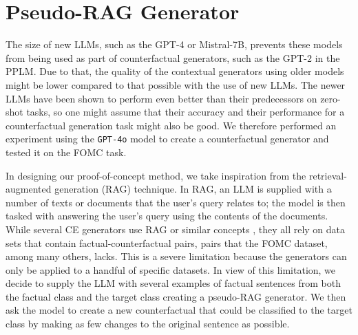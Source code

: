 \documentclass[11pt]{article}
\begin{document}
\section{Pseudo-RAG Generator}\label{appendix:pseudo-rag}

The size of new LLMs, such as the GPT-4 or Mistral-7B, prevents these models from being used as part of counterfactual generators, such as the GPT-2 in the PPLM. Due to that, the quality of the contextual generators using older models might be lower compared to that possible with the use of new LLMs. The newer LLMs have been shown to perform even better than their predecessors on zero-shot tasks, so one might assume that their accuracy and their performance for a counterfactual generation task might also be good. We therefore performed an experiment using the \texttt{GPT-4o} model to create a counterfactual generator and tested it on the FOMC task.

In designing our proof-of-concept method, we take inspiration from the retrieval-augmented generation (RAG) technique. In RAG, an LLM is supplied with a number of texts or documents that the user's query relates to; the model is then tasked with answering the user's query using the contents of the documents. While several CE generators use RAG or similar concepts \cite{dixit_core_2022}, they all rely on data sets that contain factual-counterfactual pairs, pairs that the FOMC dataset, among many others, lacks. This is a severe limitation because the generators can only be applied to a handful of specific datasets. In view of this limitation, we decide to supply the LLM with several examples of factual sentences from both the factual class and the target class creating a pseudo-RAG generator. We then ask the model to create a new counterfactual that could be classified to the target class by making as few changes to the original sentence as possible.
\end{document}
